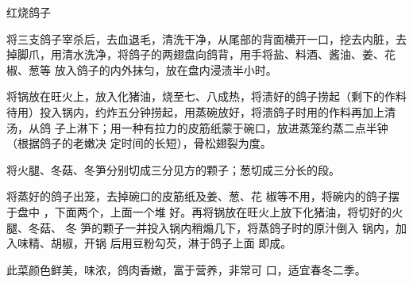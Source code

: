 \begin{recipe}{红烧鸽子}

\ingredients


\cooking

\step 将三支鸽子宰杀后，去血退毛，清洗干净，从尾部的背面横开一口，挖去内脏，去
掉脚爪，用清水洗净，将鸽子的两翅盘向鸽背，用手将盐、料酒、酱油、姜、花椒、葱等
放入鸽子的内外抹匀，放在盘内浸渍半小时。

\step 将锅放在旺火上，放入化猪油，烧至七、八成热，将渍好的鸽子捞起（剩下的作料
待用）投入锅内，约炸五分钟捞起，用蒸碗放好，将溃鸽子时用的作料再加上清汤，从鸽
子上淋下；用一种有拉力的皮筋纸蒙于碗口，放进蒸笼约蒸二点半钟（根据鸽子的老嫩决
定时间的长短），骨松翅裂为度。

\step 将火腿、冬菇、冬笋分别切成三分见方的颗子；葱切成三分长的段。

将蒸好的鸽子出笼，去掉碗口的皮筋纸及姜、葱、花 椒等不用，将碗内的鸽子摆于盘中
，下面两个，上面一个堆 好。再将锅放在旺火上放下化猪油，将切好的火腿、冬菇、 冬
笋的颗子一并投入锅内稍煽几下，将蒸鸽子时的原汁倒入 锅内，加入味精、胡椒，开锅
后用豆粉勾芡，淋于鸽子上面 即成。

\notes

此菜颜色鲜美，味浓，鸽肉香嫩，富于营养，非常可 口，适宜春冬二季。

\end{recipe}

